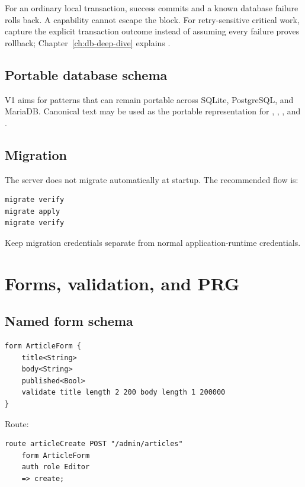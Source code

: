 For an ordinary local transaction, success commits and a known database failure rolls back. A  capability cannot escape the block. For retry-sensitive critical work, capture the explicit transaction outcome instead of assuming every failure proves rollback; Chapter~\ref{ch:db-deep-dive} explains .

\subsection*{Portable database schema}

V1 aims for patterns that can remain portable across SQLite, PostgreSQL, and MariaDB. Canonical text may be used as the portable representation for , , , and .

\subsection*{Migration}

The server does not migrate automatically at startup. The recommended flow is:

\begin{lstlisting}
migrate verify
migrate apply
migrate verify
\end{lstlisting}

Keep migration credentials separate from normal application-runtime credentials.

\section{Forms, validation, and PRG}

\subsection*{Named form schema}

\begin{lstlisting}[language=RWLang]
form ArticleForm {
    title<String>
    body<String>
    published<Bool>
    validate title length 2 200 body length 1 200000
}
\end{lstlisting}

Route:

\begin{lstlisting}[language=RWLang]
route articleCreate POST "/admin/articles"
    form ArticleForm
    auth role Editor
    => create;
\end{lstlisting}

